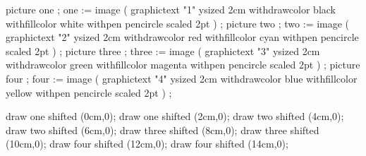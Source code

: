 
\startMPpage
    picture one   ; one   := image ( graphictext "1" ysized 2cm
        withdrawcolor black
        withfillcolor white
        withpen pencircle scaled 2pt ) ;
    picture two   ; two   := image ( graphictext "2" ysized 2cm
        withdrawcolor red
        withfillcolor cyan
        withpen pencircle scaled 2pt ) ;
    picture three ; three := image ( graphictext "3" ysized 2cm
        withdrawcolor green
        withfillcolor magenta
        withpen pencircle scaled 2pt ) ;
    picture four  ; four  := image ( graphictext "4" ysized 2cm
        withdrawcolor blue
        withfillcolor yellow
        withpen pencircle scaled 2pt ) ;

    draw one   shifted (0cm,0);
    draw one   shifted (2cm,0);
    draw two   shifted (4cm,0);
    draw two   shifted (6cm,0);
    draw three shifted (8cm,0);
    draw three shifted (10cm,0);
    draw four  shifted (12cm,0); %
    draw four  shifted (14cm,0); %
\stopMPpage
